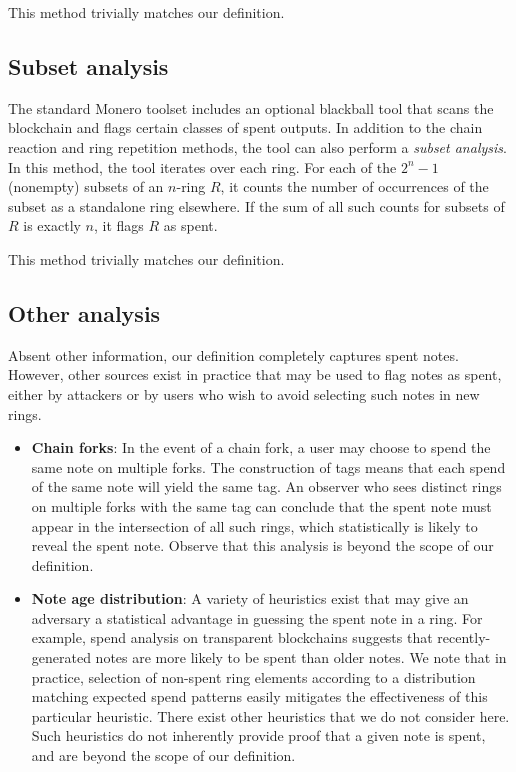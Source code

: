 \documentclass{mrl}
\begin{document}
This method trivially matches our definition.

\subsection{Subset analysis}
The standard Monero toolset includes an optional blackball tool that scans the blockchain and flags certain classes of spent outputs. In addition to the chain reaction and ring repetition methods, the tool can also perform a \textit{subset analysis}. In this method, the tool iterates over each ring. For each of the $2^n-1$ (nonempty) subsets of an $n$-ring $R$, it counts the number of occurrences of the subset as a standalone ring elsewhere. If the sum of all such counts for subsets of $R$ is exactly $n$, it flags $R$ as spent.

This method trivially matches our definition.

\subsection{Other analysis}
Absent other information, our definition completely captures spent notes. However, other sources exist in practice that may be used to flag notes as spent, either by attackers or by users who wish to avoid selecting such notes in new rings.

\begin{itemize}
\item \textbf{Chain forks}: In the event of a chain fork, a user may choose to spend the same note on multiple forks. The construction of tags means that each spend of the same note will yield the same tag. An observer who sees distinct rings on multiple forks with the same tag can conclude that the spent note must appear in the intersection of all such rings, which statistically is likely to reveal the spent note. Observe that this analysis is beyond the scope of our definition.
\item \textbf{Note age distribution}: A variety of heuristics exist that may give an adversary a statistical advantage in guessing the spent note in a ring. For example, spend analysis on transparent blockchains suggests that recently-generated notes are more likely to be spent than older notes. We note that in practice, selection of non-spent ring elements according to a distribution matching expected spend patterns easily mitigates the effectiveness of this particular heuristic. There exist other heuristics that we do not consider here. Such heuristics do not inherently provide proof that a given note is spent, and are beyond the scope of our definition. 
\end{itemize}
\end{document}

